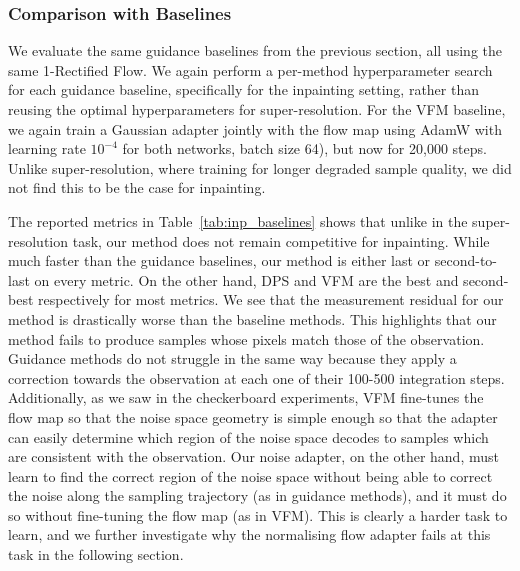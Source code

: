 \documentclass[12pt,a4paper]{report}
\begin{document}
\subsubsection{Comparison with Baselines}
We evaluate the same guidance baselines from the previous section, all using the same  1-Rectified Flow. 
We again perform a per-method hyperparameter search for each guidance baseline, specifically for the inpainting setting, rather than reusing the optimal hyperparameters for super-resolution.   
For the VFM baseline, we again train a Gaussian adapter jointly with the flow map using AdamW with learning rate $10^{-4}$ for both networks, batch size 64), but now for 20{,}000 steps.
Unlike super-resolution, where training for longer degraded sample quality, we did not find this to be the case for inpainting. 

The reported metrics in Table~\ref{tab:inp_baselines} shows that unlike in the super-resolution task, our method does not remain competitive for inpainting. While much faster than the guidance baselines, our method is either last or second-to-last on every metric. 
On the other hand, DPS and VFM are the best and second-best respectively for most metrics. 
We see that the measurement residual for our method is drastically worse than the baseline methods. This highlights that our method fails to produce samples whose pixels match those of the observation.  
Guidance methods do not struggle in the same way because they apply a correction towards the observation at each one of their 100-500 integration steps. 
Additionally, as we saw in the checkerboard experiments, VFM fine-tunes the flow map so that the noise space geometry is simple enough so that the adapter can easily determine which region of the noise space decodes to samples which are consistent with the observation.  
Our noise adapter, on the other hand, must learn to find the correct region of the noise space without being able to correct the noise along the sampling trajectory (as in guidance methods), and it must do so without fine-tuning the flow map (as in VFM). 
This is clearly a harder task to learn, and we further investigate why the normalising flow adapter fails at this task in the following section. 
\end{document}
